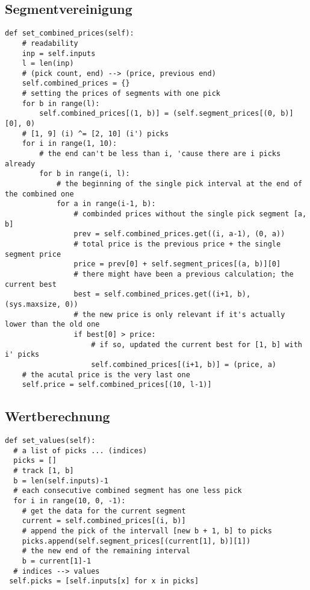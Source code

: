 \documentclass[a4paper,10pt,ngerman]{scrartcl}
\begin{document}
\subsection{Segmentvereinigung}
\begin{lstlisting}[frame=single]
def set_combined_prices(self):
    # readability
    inp = self.inputs
    l = len(inp)
    # (pick count, end) --> (price, previous end)
    self.combined_prices = {}
    # setting the prices of segments with one pick
    for b in range(l):
        self.combined_prices[(1, b)] = (self.segment_prices[(0, b)][0], 0)
    # [1, 9] (i) ^= [2, 10] (i') picks
    for i in range(1, 10):
        # the end can't be less than i, 'cause there are i picks already
        for b in range(i, l):
            # the beginning of the single pick interval at the end of the combined one
            for a in range(i-1, b):
                # combinded prices without the single pick segment [a, b]
                prev = self.combined_prices.get((i, a-1), (0, a))
                # total price is the previous price + the single segment price
                price = prev[0] + self.segment_prices[(a, b)][0]
                # there might have been a previous calculation; the current best
                best = self.combined_prices.get((i+1, b), (sys.maxsize, 0))
                # the new price is only relevant if it's actually lower than the old one
                if best[0] > price:
                    # if so, updated the current best for [1, b] with i' picks
                    self.combined_prices[(i+1, b)] = (price, a)
    # the acutal price is the very last one
    self.price = self.combined_prices[(10, l-1)]
\end{lstlisting}
\subsection{Wertberechnung}
\begin{lstlisting}[frame=single]
def set_values(self):
  # a list of picks ... (indices)
  picks = []
  # track [1, b]
  b = len(self.inputs)-1
  # each consecutive combined segment has one less pick
  for i in range(10, 0, -1):
    # get the data for the current segment
    current = self.combined_prices[(i, b)]
    # append the pick of the intervall [new b + 1, b] to picks
    picks.append(self.segment_prices[(current[1], b)][1])
    # the new end of the remaining interval
    b = current[1]-1
  # indices --> values
 self.picks = [self.inputs[x] for x in picks] 
\end{lstlisting}
\end{document}
